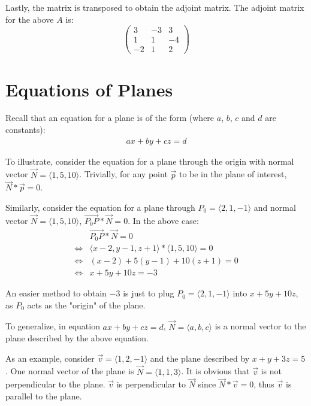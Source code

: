 \documentclass[12pt]{article}
\newcommand{\iv}[1]{\langle #1 \rangle}
\theoremstyle{definition}
\begin{document}
	Lastly, the matrix is transposed to obtain the adjoint matrix. The adjoint matrix for the above $A$ is:
	\begin{equation*}
		\begin{pmatrix}
			3 & -3 & 3 \\ 1 & 1 & -4 \\ -2 & 1 & 2
		\end{pmatrix}
	\end{equation*}
	
	\section{Equations of Planes}
	
	Recall that an equation for a plane is of the form (where $a$, $b$, $c$ and $d$ are constants):
	\begin{gather*}
		ax + by + cz = d
	\end{gather*}
	
	To illustrate, consider the equation for a plane through the origin with normal vector $\vec{N} = \iv{1, 5, 10}$. Trivially, for any point $\vec{p}$ to be in the plane of interest, $\vec{N} * \vec{p} = 0$.
	
	Similarly, consider the equation for a plane through $P_0 = \iv{2, 1, -1}$ and normal vector $\vec{N} = \iv{1, 5, 10}$, $\overrightarrow{P_0P} * \vec{N} = 0$. In the above case:
	\begin{align*}
		& \overrightarrow{P_0P} * \vec{N} = 0 \\
		\iff & \iv{x - 2, y - 1, z + 1} * \iv{1, 5, 10} = 0 \\
		\iff & (x - 2) + 5(y - 1) + 10(z + 1) = 0 \\
		\iff & x + 5y + 10z = -3
	\end{align*}
	
	An easier method to obtain $-3$ is just to plug $P_0 = \iv{2, 1, -1}$ into $x + 5y + 10z$, as $P_0$ acts as the "origin" of the plane.
	
	To generalize, in equation $ax + by + cz = d$, $\vec{N} = \iv{a, b, c}$ is a normal vector to the plane described by the above equation.
	
	As an example, consider $\vec{v} = \iv{1, 2, -1}$ and the plane described by $x + y + 3z = 5$. One normal vector of the plane is $\vec{N} = \iv{1, 1, 3}$. It is obvious that $\vec{v}$ is not perpendicular to the plane. $\vec{v}$ is perpendicular to $\vec{N}$ since $\vec{N} * \vec{v} = 0$, thus $\vec{v}$ is parallel to the plane.
	
\end{document}
